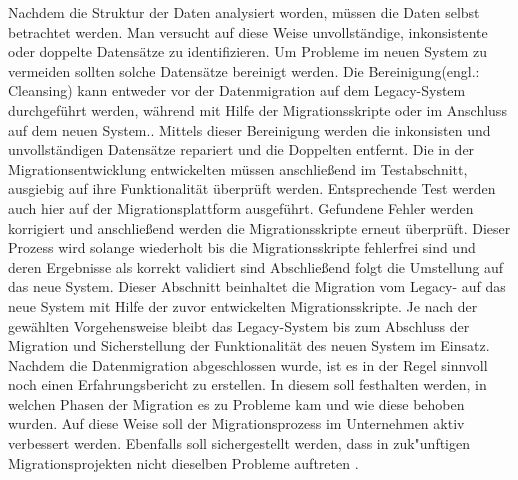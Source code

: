 \lb
Nachdem die Struktur der Daten analysiert worden, müssen die Daten selbst betrachtet werden. Man versucht auf diese Weise unvollständige, inkonsistente oder doppelte Datensätze zu identifizieren. Um Probleme im neuen System zu vermeiden sollten solche Datensätze bereinigt werden. Die Bereinigung(engl.: Cleansing) kann entweder vor der Datenmigration auf dem Legacy-System durchgeführt werden, während mit Hilfe der Migrationsskripte oder im Anschluss auf dem neuen System.\citep[S~7f.]{klausMatthesSchulz-2012}. Mittels dieser Bereinigung werden die inkonsisten und unvollständigen Datensätze repariert und die Doppelten entfernt\citep[S.~7f.]{rahm-2010}. 
\lb
Die in der Migrationsentwicklung entwickelten müssen anschließend im Testabschnitt, ausgiebig auf ihre Funktionalität überprüft werden. Entsprechende Test werden auch hier auf der Migrationsplattform ausgeführt\citep[S.~8f]{klausMatthesSchulz-2012}. Gefundene Fehler werden korrigiert und anschließend werden die Migrationsskripte erneut überprüft. Dieser Prozess wird solange wiederholt bis die Migrationsskripte fehlerfrei sind und deren Ergebnisse als korrekt validiert sind\citep[S.~8f]{klausMatthesSchulz-2012}
\lb
Abschließend folgt die Umstellung auf das neue System. Dieser Abschnitt beinhaltet die Migration vom Legacy- auf das neue System mit Hilfe der zuvor entwickelten Migrationsskripte. Je nach der gewählten Vorgehensweise bleibt das Legacy-System bis zum Abschluss der Migration und Sicherstellung der Funktionalität des neuen System im Einsatz\citep[S.~107]{bisbal-1999}. 
\lb
Nachdem die Datenmigration abgeschlossen wurde, ist es in der Regel sinnvoll noch einen Erfahrungsbericht zu erstellen. In diesem soll festhalten werden, in welchen Phasen der Migration es zu Probleme kam und wie diese behoben wurden. Auf diese Weise soll der Migrationsprozess im Unternehmen aktiv verbessert werden. Ebenfalls soll sichergestellt werden, dass in zuk"unftigen Migrationsprojekten nicht dieselben Probleme auftreten \citep[S.~10]{klausMatthesSchulz-2012}.


